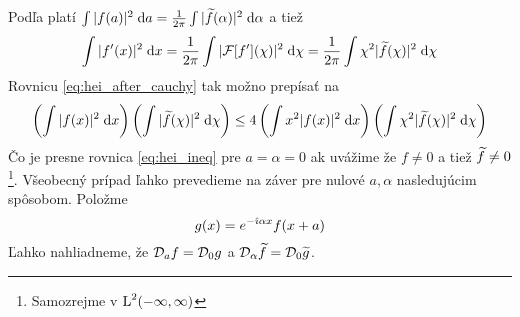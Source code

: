 \begin{dokaz}
    Podľa  platí
    $\int |f(a)|^2 \; \mathrm{d} a = \frac{1}{2\pi} \int |\widetilde{f}(\alpha)|^2 \; \mathrm{d}
    \alpha$ a tiež 
    \begin{equation}
        \int |f'(x)|^2 \; \mathrm{d} x = \frac{1}{2 \pi}
            \int |\mathcal{F}[f'](\chi)|^2 \; \mathrm{d} \chi = 
            \frac{1}{2 \pi} \int \chi^2 |\widetilde{f}(\chi)|^2 \; \mathrm{d} \chi
    \end{equation}
    Rovnicu \ref{eq:hei_after_cauchy} tak možno prepísať na
    \begin{equation}
        \left( \int |f(x)|^2 \; \mathrm{d} x \right)
        \left( \int |\widetilde{f}(\chi)|^2 \; \mathrm{d} \chi \right)
        \le 4
        \left(\int x^2 |f(x)|^2 \; \mathrm{d} x \right)
        \left(\int \chi^2 |\widetilde{f}(\chi)|^2 \; \mathrm{d} \chi\right)
    \end{equation}
    Čo je presne rovnica \ref{eq:hei_ineq} pre $a=\alpha=0$ ak uvážime že
    $f\not=0$ a tiež $\widetilde{f}\not=0$ \footnote{Samozrejme v $\mbox{L}^2(-\infty,\infty)$}.
    Všeobecný prípad ľahko prevedieme na záver pre nulové $a,\alpha$
    nasledujúcim spôsobom.
    Položme
    \begin{equation}
        g(x) = e^{-\hat{\imath} \alpha x} f(x + a)
    \end{equation}
     Ľahko nahliadneme, že $\mathcal{D}_{a} f = \mathcal{D}_{0}g$ a 
    $\mathcal{D}_{\alpha}\widetilde{f} = \mathcal{D}_{0}\widetilde{g}$.
\end{dokaz}

